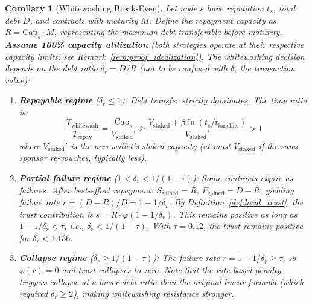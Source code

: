 \documentclass[11pt]{article}
\newtheorem{corollary}[theorem]{Corollary}
\begin{document}
\begin{corollary}[Whitewashing Break-Even]\label{cor:whitewash_breakeven}
Let node $s$ have reputation $t_s$, total debt $D$, and contracts with maturity $M$. Define the \emph{repayment capacity} as $R = \text{Cap}_s \cdot M$, representing the maximum debt transferable before maturity. \textbf{Assume 100\% capacity utilization} (both strategies operate at their respective capacity limits; see Remark~\ref{rem:proof_idealization}). The whitewashing decision depends on the \emph{debt ratio} $\delta_r = D / R$ (not to be confused with $\delta$, the transaction value):

\begin{enumerate}
    \item \textbf{Repayable regime} ($\delta_r \leq 1$): Debt transfer strictly dominates. The time ratio is:
    \begin{equation}
        \frac{T_{\text{whitewash}}}{T_{\text{repay}}} = \frac{\text{Cap}_s}{V_{\text{staked}}'} \geq \frac{V_{\text{staked}} + \beta \ln(t_s / t_{\text{baseline}})}{V_{\text{staked}}'} > 1
    \end{equation}
    where $V_{\text{staked}}'$ is the new wallet's staked capacity (at most $V_{\text{staked}}$ if the same sponsor re-vouches, typically less).
    
    \item \textbf{Partial failure regime} ($1 < \delta_r < 1/(1-\tau)$): Some contracts expire as failures. After best-effort repayment: $S_{\text{gained}} = R$, $F_{\text{gained}} = D - R$, yielding failure rate $r = (D-R)/D = 1 - 1/\delta_r$. By Definition~\ref{def:local_trust}, the trust contribution is $s = R \cdot \varphi(1 - 1/\delta_r)$. This remains positive as long as $1 - 1/\delta_r < \tau$, i.e., $\delta_r < 1/(1-\tau)$. With $\tau = 0.12$, the trust remains positive for $\delta_r < 1.136$.
    
    \item \textbf{Collapse regime} ($\delta_r \geq 1/(1-\tau)$): The failure rate $r = 1 - 1/\delta_r \geq \tau$, so $\varphi(r) = 0$ and trust collapses to zero. Note that the rate-based penalty triggers collapse at a \emph{lower} debt ratio than the original linear formula (which required $\delta_r \geq 2$), making whitewashing resistance \emph{stronger}.
\end{enumerate}
\end{corollary}
\end{document}
